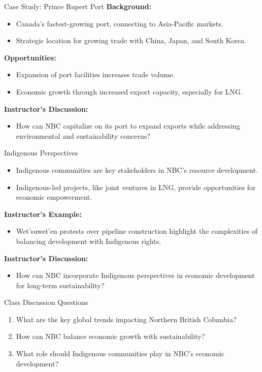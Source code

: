 \documentclass{beamer}
\begin{document}
\begin{frame}{Case Study: Prince Rupert Port}
    \textbf{Background:}
    \begin{itemize}
        \item Canada’s fastest-growing port, connecting to Asia-Pacific markets.
        \item Strategic location for growing trade with China, Japan, and South Korea.
    \end{itemize}
    \textbf{Opportunities:}
    \begin{itemize}
        \item Expansion of port facilities increases trade volume.
        \item Economic growth through increased export capacity, especially for LNG.
    \end{itemize}
    \textbf{Instructor's Discussion:}
    \begin{itemize}
        \item How can NBC capitalize on its port to expand exports while addressing environmental and sustainability concerns?
    \end{itemize}
\end{frame}

\begin{frame}{Indigenous Perspectives}
    \begin{itemize}
        \item Indigenous communities are key stakeholders in NBC’s resource development.
        \item Indigenous-led projects, like joint ventures in LNG, provide opportunities for economic empowerment.
    \end{itemize}
    \textbf{Instructor’s Example:}
    \begin{itemize}
        \item Wet’suwet’en protests over pipeline construction highlight the complexities of balancing development with Indigenous rights.
    \end{itemize}
    \textbf{Instructor's Discussion:}
    \begin{itemize}
        \item How can NBC incorporate Indigenous perspectives in economic development for long-term sustainability?
    \end{itemize}
\end{frame}

\begin{frame}{Class Discussion Questions}
    \begin{enumerate}
        \item What are the key global trends impacting Northern British Columbia?
        \item How can NBC balance economic growth with sustainability?
        \item What role should Indigenous communities play in NBC’s economic development?
    \end{enumerate}
\end{frame}
\end{document}

